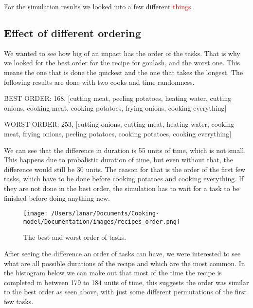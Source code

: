 For the simulation results we looked into a few different \textcolor{red}{things}.

\subsection{Effect of different ordering}
We wanted to see how big of an impact has the order of the tasks. That is why we looked for the best order for the recipe for goulash, and the worst one. This means the one that is done the quickest and the one that takes the longest.
The following results are done with two cooks and time randomness.

\begin{verbnobox}[\fontsize{10pt}{10pt}\selectfont]
BEST ORDER: 168, 
[cutting meat, peeling potatoes, heating water, cutting onions, cooking meat, 
cooking potatoes, frying onions, cooking everything]
\end{verbnobox}

\begin{verbnobox}[\fontsize{10pt}{10pt}\selectfont]
WORST ORDER: 253,
[cutting onions, cutting meat, heating water, cooking meat,
 frying onions, peeling potatoes, cooking potatoes, cooking everything]
\end{verbnobox}

We can see that the difference in duration is 55 units of time, which is not small. 
This happens due to probalistic duration of time, but even without that, the difference would still be 30 units. The reason for that is the order of the first few tasks, 
which have to be done before cooking potatoes and cooking everything. If they are not done in the best order, the simulation has to wait for a task to be finished before doing anything new. 

\begin{figure}[H]
    \centerline{\texttt{[image: /Users/lanar/Documents/Cooking-model/Documentation/images/recipes\_order.png]}}
    \caption{The best and worst order of tasks.}
    \label{fig3}
\end{figure}

After seeing the difference an order of tasks can have, we were interested to see what are all possible durations of the recipe and which are the most common. 
In the histogram below we can make out that most of the time the recipe is completed in between 179 to 184 units of time, this suggests the order was similar to the best order as seen above, with just some different permutations of the first few tasks.

